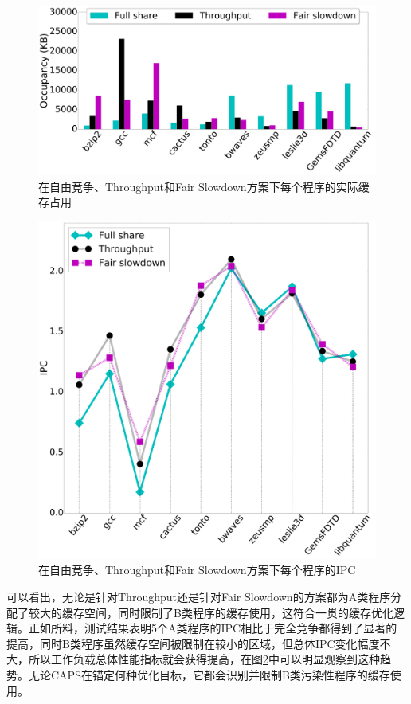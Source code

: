 \begin{figure}[htbp]
\centering
\includegraphics[width=0.9\linewidth]{figures/occ.pdf}
\caption{在自由竞争、Throughput和Fair Slowdown方案下每个程序的实际缓存占用}
\label{fig:case_occu}
\end{figure} 

\begin{figure}[htbp]
\centering
\includegraphics[width=0.6\columnwidth]{figures/case_ipc.pdf}
\caption{在自由竞争、Throughput和Fair Slowdown方案下每个程序的IPC}
\label{fig:case_ipc}
\end{figure} 

可以看出，无论是针对Throughput还是针对Fair Slowdown的方案都为A类程序分配了较大的缓存空间，同时限制了B类程序的缓存使用，这符合一贯的缓存优化逻辑。正如所料，测试结果表明5个A类程序的IPC相比于完全竞争都得到了显著的提高，同时B类程序虽然缓存空间被限制在较小的区域，但总体IPC变化幅度不大，所以工作负载总体性能指标就会获得提高，在图\ref{fig:case_ipc}中可以明显观察到这种趋势。无论CAPS在锚定何种优化目标，它都会识别并限制B类污染性程序的缓存使用。


